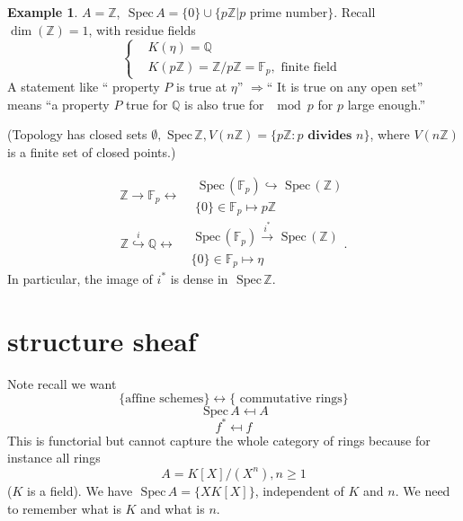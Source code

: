 \documentclass[11pt]{article}
\theoremstyle{definition}
\newtheorem{ex}[thm]{Example}
\newcommand{\spec}{\text{ Spec}\,}
\newcommand{\intg}{\mathbb Z}
\newcommand{\bbf}{\mathbb F}
\newcommand{\ratl}{\mathbb Q}
\newcommand{\Lrta}{\Longrightarrow}
\newcommand{\lrta}{\longrightarrow}
\newcommand{\llrta}{\longleftrightarrow}
\newcommand{\inj}{\hookrightarrow}
\begin{document}
\begin{ex}
$A=\intg$, $\spec A=\{0\}\cup \{p\intg|p\text{ prime number}\}$.
Recall $\dim (\intg)=1$, with residue fields 
$$
\left\{\begin{aligned}
&K(\eta)=\ratl\\
&K(p\intg)=\intg/p\intg=\bbf_p, \text{  finite field }
\end{aligned}\right.
$$
A statement like `` property  $P$ is true at $\eta$'' $\Lrta $`` It is true on any open set'' means ``a property $P$ true for $\ratl$ is also true for $\mod p$ for $p$ large enough.''

(Topology has closed sets $\emptyset, \spec \intg, V(n\intg)=\{p\intg: p\textbf{ divides }n\}$, where $V(n\intg)$ is a finite set of closed points.)

$$
\intg\lrta \bbf_p\llrta \begin{aligned}
&\spec (\bbf_p)\inj \spec (\intg)\\
& \{0\}\in\bbf_p\mapsto  p\intg
\end{aligned}
$$
$$
\intg\overset{i}{\inj} \ratl\llrta \begin{aligned}
&\spec (\bbf_p)\overset{i^*}{\lrta} \spec (\intg)\\
& \{0\}\in\bbf_p\mapsto  \eta
\end{aligned}.
$$
In particular, the image of $i^*$ is dense in $\spec \intg$.
\end{ex}
\section*{structure sheaf}

Note recall we want
$$
\{\text{affine schemes}\}\llrta \{\text{ commutative rings}\}
$$
$$
\spec A\mapsfrom A
$$
$$
f^*\mapsfrom f
$$
This is functorial but cannot capture the whole category of rings because for instance all rings
$$
A=K[X]/(X^n), n\geq 1
$$
($K$ is a field). We have $\spec A=\{XK[X]\}$, independent of $K$ and $n$. We need to remember what is $K$ and  what is $n$.
\end{document}

